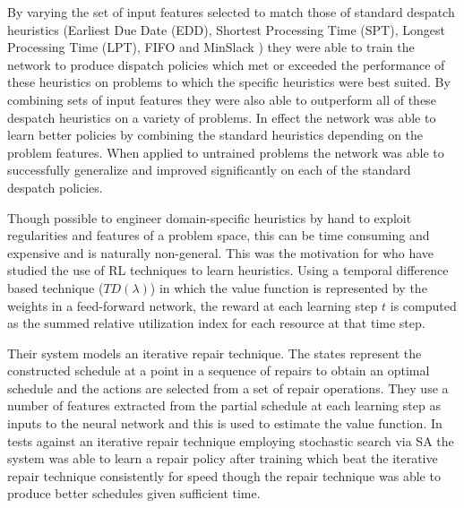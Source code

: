  By varying the set of input features selected to match those of standard despatch heuristics (Earliest Due Date (EDD), Shortest Processing Time (SPT), Longest Processing Time (LPT), FIFO and MinSlack \citep{smith93slack}) they were able to train the network to produce dispatch policies which met or exceeded the performance of these heuristics on problems to which the specific heuristics were best suited. By combining sets of input features they were also able to outperform all of these despatch heuristics on a variety of problems. In effect the network was able to learn better policies by combining the standard heuristics depending on the problem features. When applied to untrained problems the network was able to successfully generalize and improved significantly on each of the standard despatch policies.

Though possible to engineer domain-specific heuristics by hand to exploit regularities and features of a problem space, this can be time consuming and expensive and is naturally non-general. This was the motivation for \citet{zhang95reinforcement} who have studied the use of RL techniques to learn heuristics. Using a temporal difference based technique ($TD(\lambda)$) in which the value function is represented by the weights in a feed-forward network, the reward at each learning step $t$ is computed as the summed relative utilization index for each resource at that time step.


Their system models an iterative repair technique. The states represent the constructed schedule at a point in a sequence of repairs to obtain an optimal schedule and the actions are selected from a set of repair operations. They use a number of features extracted from the partial schedule at each learning step as inputs to the neural network and this is used to estimate the value function. In tests against an iterative repair technique employing stochastic search via SA \citep{zweben94scheduling} the system was able to learn a repair policy after training which beat the iterative repair technique consistently for speed though the repair technique was able to produce better schedules given sufficient time.

